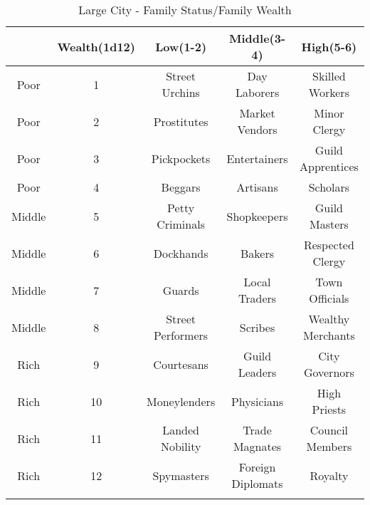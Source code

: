 \documentclass[itdr/core]{subfiles}
\begin{document}
\begin{longtable}{ccccc}
\hline
& \textbf{Wealth(1d12)} & \textbf{Low(1-2)} & \textbf{Middle(3-4)} & \textbf{High(5-6)} \\
\hline
Poor & 1 & Street Urchins & Day Laborers & Skilled Workers \\
Poor & 2 & Prostitutes & Market Vendors & Minor Clergy \\
Poor & 3 & Pickpockets & Entertainers & Guild Apprentices \\
Poor & 4 & Beggars & Artisans & Scholars \\
Middle & 5 & Petty Criminals & Shopkeepers & Guild Masters \\
Middle & 6 & Dockhands & Bakers & Respected Clergy \\
Middle & 7 & Guards & Local Traders & Town Officials \\
Middle & 8 & Street Performers & Scribes & Wealthy Merchants \\
Rich & 9 & Courtesans & Guild Leaders & City Governors \\
Rich & 10 & Moneylenders & Physicians & High Priests \\
Rich & 11 & Landed Nobility & Trade Magnates & Council Members \\
Rich & 12 & Spymasters & Foreign Diplomats & Royalty \\
\hline
\caption{Large City - Family Status/Family Wealth}
\label{table:large-city-status}
\end{longtable}
\end{document}
